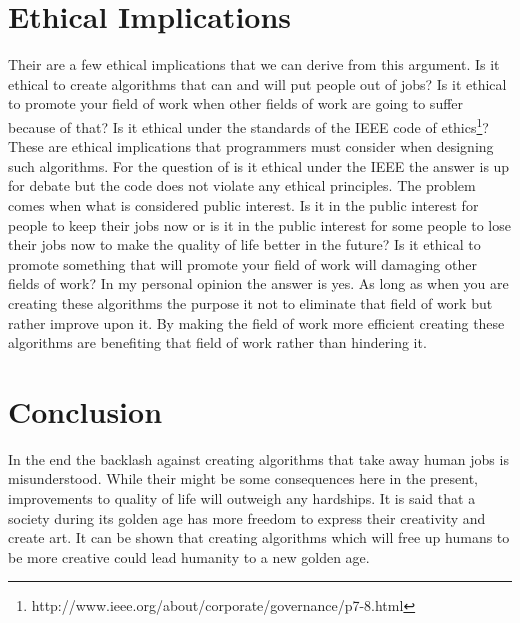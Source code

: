\documentclass[a4paper,11pt, twocolumn]{article}
\begin{document}
\section{Ethical Implications} 
Their are a few ethical implications that we can derive from this argument. Is it ethical to create algorithms that can and will put people out of jobs? Is it ethical to promote your field of work when other fields of work are going to suffer because of that? Is it ethical under the standards of the IEEE code of ethics\footnote{http://www.ieee.org/about/corporate/governance/p7-8.html}? These are ethical implications that programmers must consider when designing such algorithms. For the question of is it ethical under the IEEE the answer is up for debate but the code does not violate any ethical principles. The problem comes when what is considered public interest. Is it in the public interest for people to keep their jobs now or is it in the public interest for some people to lose their jobs now to make the quality of life better in the future? Is it ethical to promote something that will promote your field of work will damaging other fields of work? In my personal opinion the answer is yes. As long as when you are creating these algorithms the purpose it not to eliminate that field of work but rather improve upon it. By making the field of work more efficient creating these algorithms are benefiting that field of work rather than hindering it. 
 
\section{Conclusion} 
In the end the backlash against creating algorithms that take away human jobs is misunderstood. While their might be some consequences here in the present, improvements to quality of life will outweigh any hardships. It is said that a society during its golden age has more freedom to express their creativity and create art. It can be shown that creating algorithms which will free up humans to be more creative could lead humanity to a new golden age. 
 
\end{document}
